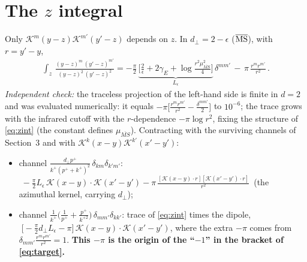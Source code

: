 \documentclass[10pt]{article}
\newcommand{\Leps}{L_{\epsilon}}
\begin{document}
\section{The $z$ integral}
Only $\mathcal K^{m}(y-z)\mathcal K^{m'}(y'-z)$ depends on $z$. In $d_{\perp}=2-\epsilon$
($\overline{\rm MS}$), with $r=y'-y$,
\begin{align}\label{eq:zint}
\int_{z}\,\frac{(y-z)^{m}\,(y'-z)^{m'}}{(y-z)^{2}\,(y'-z)^{2}}
=-\frac{\pi}{2}\,\underbrace{\Big[\frac{2}{\epsilon}+2\gamma_{E}+\log\frac{r^{2}\mu^{2}_{\overline{MS}}}{4}\Big]}_{\textstyle \Leps}\,\delta^{mm'}\,-\,\pi\,\frac{r^{m}r^{m'}}{r^{2}}\,.
\end{align}
\emph{Independent check:} the traceless projection of the left-hand side is finite in $d=2$ and was
evaluated numerically: it equals $-\pi\big[\frac{r^{m}r^{m'}}{r^{2}}-\frac{\delta^{mm'}}{2}\big]$ to
$10^{-6}$; the trace grows with the infrared cutoff with the $r$-dependence $-\pi\log r^{2}$, fixing
the structure of \eqref{eq:zint} (the constant defines $\mu_{\overline{MS}}$). Contracting with the
surviving channels of Section~3 and with $\mathcal K^{k}(x-y)\mathcal K^{k'}(x'-y')$:
\begin{itemize}
\item channel $\frac{d_{\perp}p^{+}}{k^{+}(p^{+}+k^{+})^{2}}\,\delta_{km}\delta_{k'm'}$:
$\;-\frac{\pi}{2}\Leps\,\mathcal K(x-y)\!\cdot\!\mathcal K(x'-y')
-\pi\,\frac{[\mathcal K(x-y)\cdot r][\mathcal K(x'-y')\cdot r]}{r^{2}}\,$ (the azimuthal kernel, carrying $d_{\perp}$);
\item channel $\frac{1}{k^{+}}\big(\frac{1}{p^{+}}+\frac{p^{+}}{k^{+2}}\big)\,\delta_{mm'}\delta_{kk'}$:
trace of \eqref{eq:zint} times the dipole,
$\;\big[-\frac{\pi}{2}d_{\perp}\Leps-\pi\big]\,\mathcal K(x-y)\!\cdot\!\mathcal K(x'-y')$,
where the extra $-\pi$ comes from $\delta_{mm'}\frac{r^{m}r^{m'}}{r^{2}}=1$.
\textbf{This $-\pi$ is the origin of the ``$-1$'' in the bracket of \eqref{eq:target}.}
\end{itemize}
\end{document}
